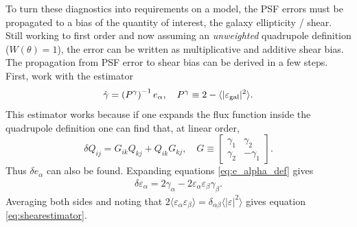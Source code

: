 \documentclass[11pt]{book}
\DeclareRobustCommand{\gal}{\ifmmode\text{gal}\else d\fi}
\newcommand{\br}[1]{\ensuremath{\left( #1 \right)}}
\begin{document}
To turn these diagnostics into requirements on a model, the PSF errors must be propagated to a bias of the quantity of interest, the galaxy ellipticity / shear. Still working to first order and now assuming an \textit{unweighted} quadrupole definition ($W(\theta)=1$), the error can be written as multiplicative and additive shear bias. The propagation from PSF error to shear bias can be derived in a few steps. First, work with the estimator
	\begin{equation}
		\hat \gamma=\br{P^\gamma}^{-1} e_\alpha, \quad P^\gamma\equiv 2-\langle |\varepsilon_\gal|^2\rangle. \label{eq:shearestimator}
	\end{equation}
	This estimator works because if one expands the flux function inside the quadrupole definition one can find that, at linear order,
	\begin{equation}
		\delta Q_{ij} = G_{ik}Q_{kj}+Q_{ik}G_{kj}, \quad G\equiv\begin{bmatrix}
			\gamma_1 &\gamma_2 \\ \gamma_2 & -\gamma_1
		\end{bmatrix}.
	\end{equation}
	Thus $\delta e_\alpha$ can also be found. Expanding equations \ref{eq:e_alpha_def} gives
	\begin{align}
		\delta \varepsilon_\alpha = 2\gamma_\alpha - 2\varepsilon_\alpha\varepsilon_\beta\gamma_\beta.
	\end{align}
	Averaging both sides and noting that $2\langle \varepsilon_\alpha\varepsilon_\beta \rangle = \delta_{\alpha\beta}\langle |\varepsilon|^2\rangle$ gives equation \ref{eq:shearestimator}.
	
\end{document}
